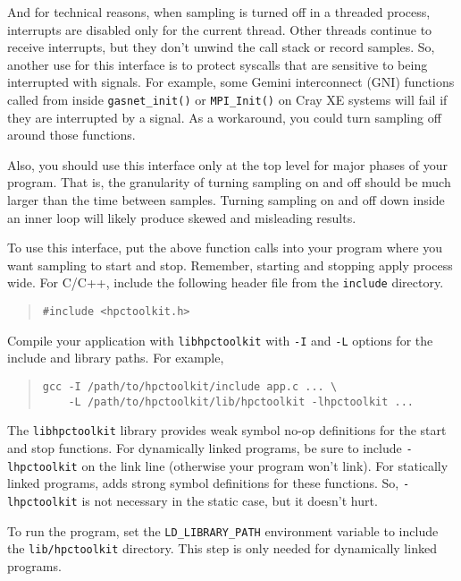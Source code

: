 And for technical reasons, when sampling is turned off in a threaded
process, interrupts are disabled only for the current thread.  Other
threads continue to receive interrupts, but they don't unwind the call
stack or record samples.  So, another use for this interface is to
protect syscalls that are sensitive to being interrupted with signals.
For example, some Gemini interconnect (GNI) functions called from
inside \verb|gasnet_init()| or \verb|MPI_Init()| on Cray XE systems
will fail if they are interrupted by a signal.  As a workaround, you
could turn sampling off around those functions.

Also, you should use this interface only at the top level for major
phases of your program.  That is, the granularity of turning sampling
on and off should be much larger than the time between samples.
Turning sampling on and off down inside an inner loop will likely
produce skewed and misleading results.

To use this interface, put the above function calls into your program
where you want sampling to start and stop.  Remember, starting and
stopping apply process wide.  For C/C++, include the following header
file from the \HPCToolkit{} \verb|include| directory.

\begin{quote}
\begin{verbatim}
#include <hpctoolkit.h>
\end{verbatim}
\end{quote}

Compile your application with \verb|libhpctoolkit| with \verb|-I| and
\verb|-L| options for the include and library paths.  For example,

\begin{quote}
\begin{verbatim}
gcc -I /path/to/hpctoolkit/include app.c ... \
    -L /path/to/hpctoolkit/lib/hpctoolkit -lhpctoolkit ...
\end{verbatim}
\end{quote}

The \verb|libhpctoolkit| library provides weak symbol no-op definitions
for the start and stop functions.  For dynamically linked programs, be
sure to include \verb|-lhpctoolkit| on the link line (otherwise your
program won't link).  For statically linked programs, \hpclink{} adds
strong symbol definitions for these functions.  So, \verb|-lhpctoolkit|
is not necessary in the static case, but it doesn't hurt.

To run the program, set the \verb|LD_LIBRARY_PATH| environment
variable to include the \HPCToolkit{} \verb|lib/hpctoolkit| directory.
This step is only needed for dynamically linked programs.

